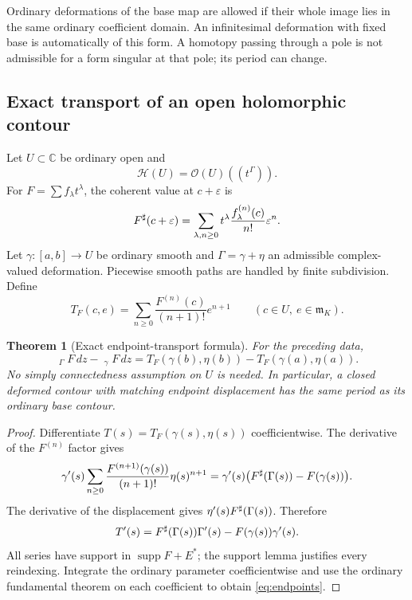 \documentclass[11pt,letterpaper]{article}
\newtheorem{theorem}{Theorem}[section]
\theoremstyle{definition}
\theoremstyle{remark}
\newcommand{\C}{\mathbb C}\newcommand{\R}{\mathbb R}\newcommand{\Q}{\mathbb Q}\newcommand{\Z}{\mathbb Z}\newcommand{\N}{\mathbb N}
\newcommand{\OO}{\mathcal O}\newcommand{\HH}{\mathcal H}\newcommand{\A}{\mathscr A}\newcommand{\m}{\mathfrak m}
\newcommand{\supp}{\operatorname{supp}}\newcommand{\red}{\operatorname{red}}\newcommand{\st}{\operatorname{st}}
\newcommand{\HInt}{\mathop{\int^{\!H}}\nolimits}\newcommand{\HCoint}{\mathop{\oint^{\!H}}\nolimits}
\numberwithin{equation}{section}
\begin{document}
Ordinary deformations of the base map are allowed if their whole image lies in the same ordinary coefficient domain. An infinitesimal deformation with fixed base is automatically of this form. A homotopy passing through a pole is not admissible for a form singular at that pole; its period can change.

\subsection{Exact transport of an open holomorphic contour}
Let $U\subset\C$ be ordinary open and
\[
 \HH(U)=\OO(U)((t^\Gamma)).
\]
For $F=\sum f_\lambda t^\lambda$, the coherent value at $c+\varepsilon$ is
\[
 F^{\sharp}(c+\varepsilon)=\sum_{\lambda,n\ge0}
          t^\lambda\frac{f_\lambda^{(n)}(c)}{n!}\varepsilon^n.
\]
Let $\gamma:[a,b]\to U$ be ordinary smooth and $\Gamma=\gamma+\eta$ an admissible complex-valued deformation. Piecewise smooth paths are handled by finite subdivision. Define
\begin{equation}\label{eq:Tendpoint}
 T_F(c,e)=\sum_{n\ge0}\frac{F^{(n)}(c)}{(n+1)!}e^{n+1}
 \qquad(c\in U,\ e\in\m_K).
\end{equation}

\begin{theorem}[Exact endpoint-transport formula]\label{thm:endpoints}
For the preceding data,
\begin{equation}\label{eq:endpoints}
 \boxed{\quad
 \HInt_\Gamma F\,dz-\HInt_\gamma F\,dz
 =T_F(\gamma(b),\eta(b))-T_F(\gamma(a),\eta(a)).
 \quad}
\end{equation}
No simply connectedness assumption on $U$ is needed. In particular, a closed deformed contour with matching endpoint displacement has the same period as its ordinary base contour.
\end{theorem}
\begin{proof}
Differentiate $T(s)=T_F(\gamma(s),\eta(s))$ coefficientwise. The derivative of the $F^{(n)}$ factor gives
\[
 \gamma'(s)\sum_{n\ge0}\frac{F^{(n+1)}(\gamma(s))}{(n+1)!}\eta(s)^{n+1}
 =\gamma'(s)\bigl(F^{\sharp}(\Gamma(s))-F(\gamma(s))\bigr).
\]
The derivative of the displacement gives $\eta'(s)F^{\sharp}(\Gamma(s))$. Therefore
\[
 T'(s)=F^{\sharp}(\Gamma(s))\Gamma'(s)-F(\gamma(s))\gamma'(s).
\]
All series have support in $\supp F+E^*$; the support lemma justifies every reindexing. Integrate the ordinary parameter coefficientwise and use the ordinary fundamental theorem on each coefficient to obtain \eqref{eq:endpoints}.
\end{proof}
\end{document}
